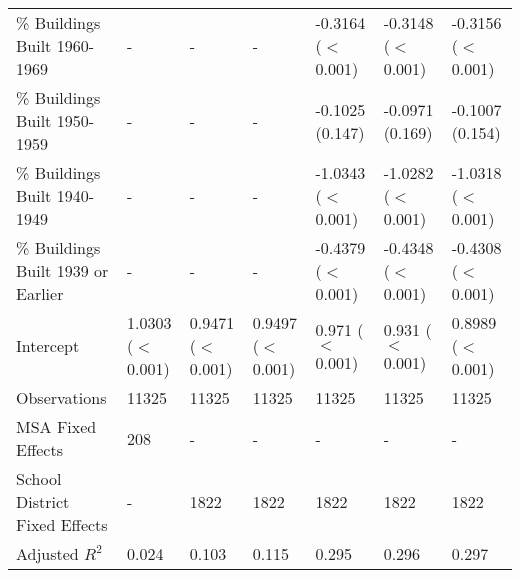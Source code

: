 \begin{table}[h]
\begin{tabular}{l|llllll}
\% Buildings Built 1960-1969 &- & - & - & -0.3164 ($<$0.001) & -0.3148 ($<$0.001) & -0.3156 ($<$0.001) \\
\% Buildings Built 1950-1959 &- & - & - & -0.1025 (0.147) & -0.0971 (0.169) & -0.1007 (0.154) \\
\% Buildings Built 1940-1949 &- & - & - & -1.0343 ($<$0.001) & -1.0282 ($<$0.001) & -1.0318 ($<$0.001) \\
\% Buildings Built 1939 or Earlier &- & - & - & -0.4379 ($<$0.001) & -0.4348 ($<$0.001) & -0.4308 ($<$0.001) \\
Intercept &1.0303 ($<$0.001) & 0.9471 ($<$0.001) & 0.9497 ($<$0.001) & 0.971 ($<$0.001) & 0.931 ($<$0.001) & 0.8989 ($<$0.001) \\
Observations &11325 & 11325 & 11325 & 11325 & 11325 & 11325 \\
MSA Fixed Effects &208 & - & - & - & - & - \\
School District Fixed Effects &- & 1822 & 1822 & 1822 & 1822 & 1822 \\
Adjusted $R^2$ &0.024 & 0.103 & 0.115 & 0.295 & 0.296 & 0.297 \\\hline
\end{tabular}
\end{table}
